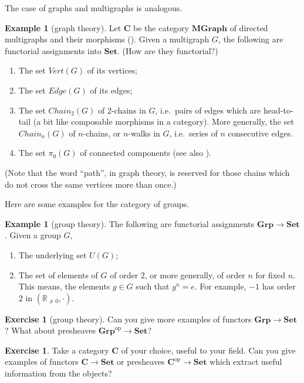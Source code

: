 \documentclass[12pt,oneside]{scrbook}
\numberwithin{equation}{section}
\theoremstyle{plain}
\theoremstyle{definition}
\newtheorem{eg}[thm]{Example}
\newtheorem{ex}[thm]{Exercise}
\newcommand{\R}{\mathbb{R}}
\newcommand{\cat}[1]{{\mathbf{#1}}} %
\newcommand{\op}{\mathrm{op}} %
\newcommand{\Set}{\cat{Set}}
\newcommand{\Grp}{\cat{Grp}}
\DeclareMathOperator{\1}{\mathbbm{1}}
\DeclareMathOperator{\2}{\mathbbm{2}}
\begin{document}
The case of graphs and multigraphs is analogous.
\begin{eg}[graph theory]\label{graphtoset}
 Let $\cat{C}$ be the category $\cat{MGraph}$ of directed multigraphs and their morphisms (). Given a multigraph $G$, the following are functorial assignments into $\Set$. (How are they functorial?)
 \begin{enumerate}
  \item The set $\mathit{Vert}(G)$ of its vertices;
  \item The set $\mathit{Edge}(G)$ of its edges;
  \item The set $\mathit{Chain}_2(G)$ of 2-chains in $G$, i.e.~pairs of edges which are head-to-tail (a bit like composable morphisms in a category). More generally, the set $\mathit{Chain}_n(G)$ of $n$-chains, or $n$-walks in $G$, i.e.~series of $n$ consecutive edges.
  \item The set $\pi_0(G)$ of connected components (see also ).
 \end{enumerate}
 (Note that the word ``path'', in graph theory, is reserved for those chains which do not cross the same vertices more than once.)
\end{eg}

Here are some examples for the category of groups.
\begin{eg}[group theory]\label{grptoset}
 The following are functorial assignments $\Grp\to\Set$. Given a group $G$,
 \begin{enumerate}
  \item The underlying set $U(G)$;
  \item The set of elements of $G$ of order $2$, or more generally, of order $n$ for fixed $n$. This means, the elements $g\in G$ such that $g^n=e$. For example, $-1$ has order $2$ in $(\R_{\ne 0},\cdot)$.
 \end{enumerate}
\end{eg}

\begin{ex}[group theory]
 Can you give more examples of functors $\Grp\to\Set$? What about presheaves $\Grp^\op\to\Set$?
\end{ex}

\begin{ex}\label{yourcatset}
 Take a category $\cat{C}$ of your choice, useful to your field. Can you give examples of functors $\cat{C}\to\Set$ or presheaves $\cat{C}^\op\to\Set$ which extract useful information from the objects?
\end{ex}
\end{document}
